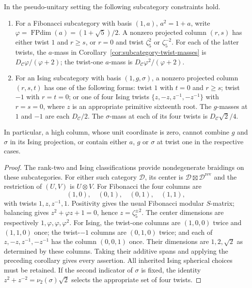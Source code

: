 \begin{corollary}\label{cor:fibonacci-ising-projection}
In the pseudo-unitary setting the following subcategory constraints hold.
\begin{enumerate}
\item For a Fibonacci subcategory with basis $(1,a)$, $a^2=1+a$, write
$\varphi=\operatorname{FPdim}(a)=(1+\sqrt5)/2$. A nonzero projected
column $(r,s)$ has either twist $1$ and $r\ge s$, or $r=0$ and twist
$\zeta_5^2$ or $\zeta_5^{-2}$. For each of the latter twists, the
$a$-mass in Corollary~\ref{cor:subcategory-twist-masses} is
$D_{\mathcal C}\varphi/(\varphi+2)$; the twist-one $a$-mass is
$D_{\mathcal C}\varphi^2/(\varphi+2)$.
\item For an Ising subcategory with basis $(1,g,\sigma)$, a nonzero projected
column $(r,s,t)$ has one of the following forms: twist $1$ with $t=0$ and
$r\ge s$; twist $-1$ with $r=t=0$; or one of four Ising twists
$\{z,-z,z^{-1},-z^{-1}\}$ with $r=s=0$, where $z$ is an appropriate
primitive sixteenth root. The $g$-masses at $1$ and $-1$ are each
$D_{\mathcal C}/2$. The $\sigma$-mass at each of its four twists is
$D_{\mathcal C}\sqrt2/4$.
\end{enumerate}
In particular, a high column, whose unit coordinate is zero, cannot combine
$g$ and $\sigma$ in its Ising projection, or contain either $a$, $g$ or
$\sigma$ at twist one in the respective cases.
\end{corollary}
\begin{proof}
The rank-two and Ising classifications \cite{Ostrik2,EGNO} provide
nondegenerate braidings on these subcategories. For either such category
$\mathcal D$, its center is
$\mathcal D\boxtimes\mathcal D^{\mathrm{rev}}$ and the restriction of
$(U,V)$ is $U\otimes V$.
For Fibonacci the four columns are
\[
 (1,0),\quad(0,1),\quad(0,1),\quad(1,1),
\]
with twists $1,z,z^{-1},1$. Positivity gives the usual Fibonacci modular
$S$-matrix; balancing gives $z^2+\varphi z+1=0$, hence
$z=\zeta_5^{\pm2}$. The center dimensions are respectively
$1,\varphi,\varphi,\varphi^2$.
For Ising, the twist-one columns are $(1,0,0)$ twice and $(1,1,0)$ once;
the twist-$-1$ columns are $(0,1,0)$ twice; and each of
$z,-z,z^{-1},-z^{-1}$ has the column $(0,0,1)$ once. Their dimensions are
$1,2,\sqrt2$ as determined by these columns. Taking their additive spans
and applying the preceding corollary gives every assertion.
All inherited Ising spherical choices must be retained. If the second
indicator of $\sigma$ is fixed, the identity
$z^2+z^{-2}=\nu_2(\sigma)\sqrt2$ selects the appropriate set of four twists.
\end{proof}


